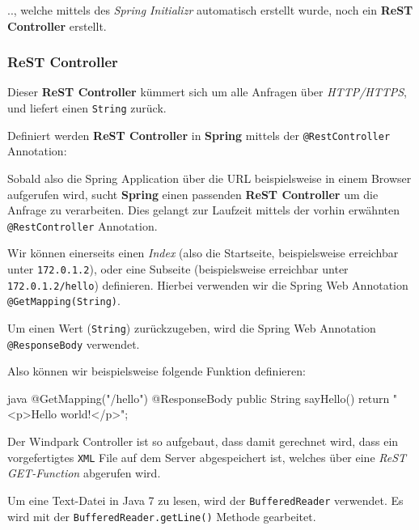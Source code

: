 .., welche mittels des \textit{Spring Initializr} automatisch erstellt wurde, noch ein \textbf{ReST Controller} erstellt.

\subsubsection{ReST Controller}

Dieser \textbf{ReST Controller} kümmert sich um alle Anfragen über \textit{HTTP/HTTPS}, und liefert einen \texttt{String} zurück.

Definiert werden \textbf{ReST Controller} in \textbf{Spring} mittels der \texttt{@RestController} Annotation:

\begin{code}{java}
    @RestController
    public class WindparkRestController {
\end{code}

Sobald also die Spring Application über die URL beispielsweise in einem Browser aufgerufen wird, sucht \textbf{Spring} einen passenden \textbf{ReST Controller} um die Anfrage zu verarbeiten. Dies gelangt zur Laufzeit mittels der vorhin erwähnten \texttt{@RestController} Annotation.

Wir können einerseits einen \textit{Index} (also die Startseite, beispielsweise erreichbar unter \texttt{172.0.1.2}), oder eine Subseite (beispielsweise erreichbar unter \texttt{172.0.1.2/hello}) definieren. Hierbei verwenden wir die Spring Web Annotation \texttt{@GetMapping(String)}.

Um einen Wert (\texttt{String}) zurückzugeben, wird die Spring Web Annotation {\texttt{@ResponseBody}} verwendet.

Also können wir beispielsweise folgende Funktion definieren:

\begin{code}{java}
    @GetMapping("/hello")
    @ResponseBody
    public String sayHello() {
        return "<p>Hello world!</p>";
    }
\end{code}

Der Windpark Controller ist so aufgebaut, dass damit gerechnet wird, dass ein vorgefertigtes \texttt{XML} File auf dem Server abgespeichert ist, welches über eine \textit{ReST GET-Function} abgerufen wird.

Um eine Text-Datei in Java 7 zu lesen, wird der \texttt{BufferedReader} verwendet. Es wird mit der \texttt{BufferedReader.getLine()} Methode gearbeitet.

